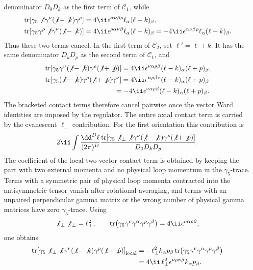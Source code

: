 denominator \(D_0D_k\) as the first term of \(\mathcal C_1\), while
\[
\begin{aligned}
  &\operatorname{tr}\!\left[
    \gamma_5\not\ell\gamma^\nu(\not\ell-\not k)\gamma^\rho
  \right]
  =
  4\ii\epsilon^{\alpha\nu\beta\rho}\ell_\alpha(\ell-k)_\beta,
\\
  &\operatorname{tr}\!\left[
    \gamma_5\gamma^\rho\not\ell\gamma^\nu(\not\ell-\not k)
  \right]
  =
  4\ii\epsilon^{\rho\alpha\nu\beta}\ell_\alpha(\ell-k)_\beta
  =
  -4\ii\epsilon^{\alpha\nu\beta\rho}\ell_\alpha(\ell-k)_\beta .
\end{aligned}
\]
Thus these two terms cancel.  In the first term of \(\mathcal C_2\), set
\(\ell'=\ell+k\).  It has the same denominator \(D_kD_p\) as the second term
of \(\mathcal C_1\), and
\[
\begin{aligned}
  &\operatorname{tr}\!\left[
    \gamma_5\gamma^\nu(\not\ell-\not k)\gamma^\rho(\not\ell+\not p)
  \right]
  =
  4\ii\epsilon^{\nu\alpha\rho\beta}
  (\ell-k)_\alpha(\ell+p)_\beta,
\\
  &\operatorname{tr}\!\left[
    \gamma_5(\not\ell-\not k)\gamma^\rho(\not\ell+\not p)\gamma^\nu
  \right]
  =
  4\ii\epsilon^{\alpha\rho\beta\nu}
  (\ell-k)_\alpha(\ell+p)_\beta
\\
  &\hspace{3.6cm}
  =
  -4\ii\epsilon^{\nu\alpha\rho\beta}
  (\ell-k)_\alpha(\ell+p)_\beta .
\end{aligned}
\]
The bracketed contact terms therefore cancel pairwise once the vector Ward
identities are imposed by the regulator.  The entire axial contact term is
carried by the evanescent \(\ell_\perp\) contribution.  For the first
orientation this contribution is
\[
  2\ii
  \int\frac{\dd^D\ell}{(2\pi)^D}
  \frac{
    \operatorname{tr}\!\left[
      \gamma_5\not\ell_\perp\not\ell\gamma^\nu
      (\not\ell-\not k)\gamma^\rho(\not\ell+\not p)
    \right]
  }{D_0D_kD_p}.
\]
The coefficient of the local two-vector contact term is obtained by keeping
the part with two external momenta and no physical loop momentum in the
\(\gamma_5\)-trace.  Terms with a symmetric pair of physical loop momenta
contracted into the antisymmetric tensor vanish after rotational averaging, and
terms with an unpaired perpendicular gamma matrix or the wrong number of
physical gamma matrices have zero \(\gamma_5\)-trace.  Using
\[
  \not\ell_\perp\not\ell_\perp=\ell_\perp^2,
  \qquad
  \operatorname{tr}\!
  \left(\gamma_5\gamma^\nu\gamma^\alpha\gamma^\rho\gamma^\beta\right)
  =
  4\ii\epsilon^{\nu\alpha\rho\beta},
\]
one obtains
\[
\begin{aligned}
  \operatorname{tr}\!\left[
    \gamma_5\not\ell_\perp\not\ell\gamma^\nu
    (\not\ell-\not k)\gamma^\rho(\not\ell+\not p)
  \right]_{\rm local}
  &=
  -\ell_\perp^2 k_\alpha p_\beta
  \operatorname{tr}\!
  \left(\gamma_5\gamma^\nu\gamma^\alpha\gamma^\rho\gamma^\beta\right)
\\
  &=
  4\ii\,\ell_\perp^2
  \epsilon^{\nu\rho\alpha\beta}k_\alpha p_\beta .
\end{aligned}
\]
